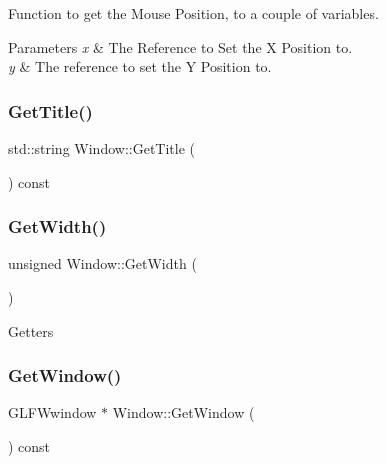 Function to get the Mouse Position, to a couple of variables. 


\begin{DoxyParams}{Parameters}
{\em x} & The Reference to Set the X Position to. \\
\hline
{\em y} & The reference to set the Y Position to. \\
\hline
\end{DoxyParams}
\mbox{\label{class_window_ae66865d49d16710c1cb11fd39ab7564f}} 
\subsubsection{\texorpdfstring{Get\+Title()}{GetTitle()}}
{\footnotesize\ttfamily std\+::string Window\+::\+Get\+Title (\begin{DoxyParamCaption}{ }\end{DoxyParamCaption}) const}

\mbox{\label{class_window_a77d5347666653b9a20c389e0e412f700}} 
\subsubsection{\texorpdfstring{Get\+Width()}{GetWidth()}}
{\footnotesize\ttfamily unsigned Window\+::\+Get\+Width (\begin{DoxyParamCaption}{ }\end{DoxyParamCaption})}

Getters \mbox{\label{class_window_ad7e49197526473b23c01ecc9cd2292d2}} 
\subsubsection{\texorpdfstring{Get\+Window()}{GetWindow()}}
{\footnotesize\ttfamily G\+L\+F\+Wwindow $\ast$ Window\+::\+Get\+Window (\begin{DoxyParamCaption}{ }\end{DoxyParamCaption}) const}

\mbox{\label{class_window_a6703058dead0231b089862ad1e226c70}} 
